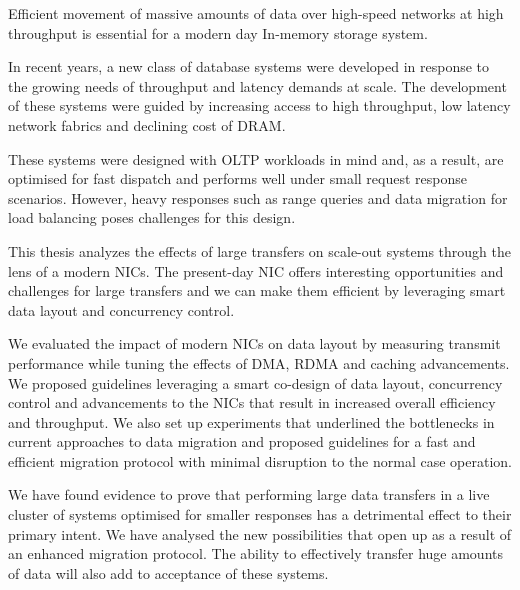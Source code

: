 

Efficient movement of massive amounts of data over high-speed networks at high 
throughput is essential for a modern day In-memory storage system.

In recent years, a new class of database systems were developed in response to the growing needs of throughput
and latency demands at scale. The development of these systems were guided by increasing
access to high throughput, low latency network fabrics and declining cost of DRAM.

These systems were designed with OLTP workloads in mind 
and, as a result, are optimised for fast dispatch and performs well under small
request response scenarios. However, heavy responses such as range queries
and data migration for load balancing poses challenges for this design.  

This thesis analyzes the effects of large transfers on scale-out systems
through the lens of a modern NICs. The present-day NIC offers interesting opportunities
and challenges for large transfers and we can make them efficient by leveraging
smart data layout and concurrency control.

We evaluated the impact of modern NICs on data layout by measuring transmit performance
while tuning the effects of DMA, RDMA and caching advancements. We proposed guidelines
leveraging a smart co-design of data layout, concurrency control and advancements to the
NICs that result in increased overall efficiency and throughput. We also set up
experiments that underlined the bottlenecks in current approaches
to data migration and proposed guidelines for a fast and efficient migration 
protocol with minimal disruption to the normal case operation.

We have found evidence to prove that performing large data transfers in a live cluster 
of systems optimised for smaller responses has a detrimental effect to their primary intent. 
We have analysed the new possibilities that open up as a result of an enhanced
migration protocol. The ability to effectively transfer huge amounts of data will
also add to acceptance of these systems.

